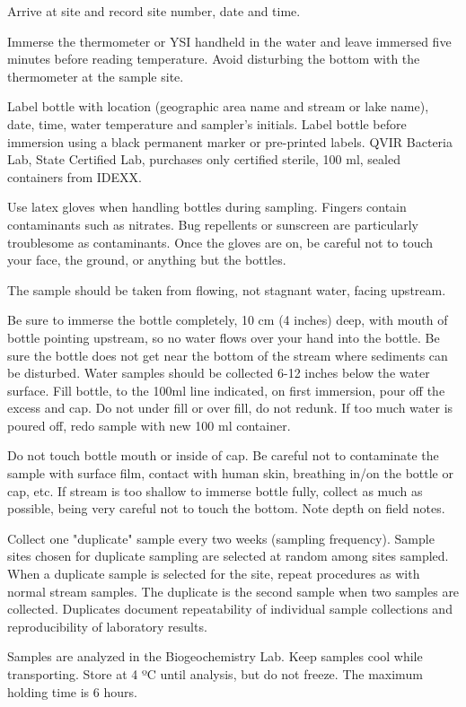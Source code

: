 \documentclass[12pt]{../SOP4_alpha}\usepackage[]{graphicx}\usepackage[]{xcolor}
\begin{document}
\NP  Arrive at site and record site number, date and time.

\NP Immerse the thermometer or YSI handheld in the water and leave immersed
five minutes before reading temperature. Avoid disturbing the bottom with
the thermometer at the sample site.

\NP Label bottle with location (geographic area name and stream or lake name),
date, time, water temperature and sampler's initials. Label bottle before
immersion using a black permanent marker or pre-printed labels. QVIR
Bacteria Lab, State Certified Lab, purchases only certified sterile, 100 ml,
sealed containers from IDEXX.


\NP Use latex gloves when handling bottles during sampling. Fingers contain
contaminants such as nitrates. Bug repellents or sunscreen are particularly 
troublesome as contaminants. Once the gloves are on, be careful not to touch
your face, the ground, or anything but the bottles.

\NP The sample should be taken from flowing, not stagnant water, facing
upstream.

\NP Be sure to immerse the bottle completely, 10 cm (4 inches) deep, with
mouth of bottle pointing upstream, so no water flows over your hand into the
bottle. Be sure the bottle does not get near the bottom of the stream where
sediments can be disturbed. Water samples should be collected 6-12 inches
below the water surface. Fill bottle, to the 100ml line indicated, on first
immersion, pour off the excess and cap. Do not under fill or over fill, do not
redunk. If too much water is poured off, redo sample with new 100 ml
container.

\NP Do not touch bottle mouth or inside of cap. Be careful not to
contaminate the sample with surface film, contact with human skin, breathing
in/on the bottle or cap, etc. If stream is too shallow to immerse bottle fully,
collect as much as possible, being very careful not to touch the bottom. Note
depth on field notes.

\NP Collect one "duplicate" sample every two weeks (sampling frequency).
Sample sites chosen for duplicate sampling are selected at random among
sites sampled. When a duplicate sample is selected for the site, repeat
procedures as with normal stream samples. The duplicate is the second
sample when two samples are collected. Duplicates document repeatability of
individual sample collections and reproducibility of laboratory results.

\NP Samples are analyzed in the Biogeochemistry Lab. Keep samples cool
while transporting. Store at 4 ºC until analysis, but do not freeze. The
maximum holding time is 6 hours.
\end{document}

